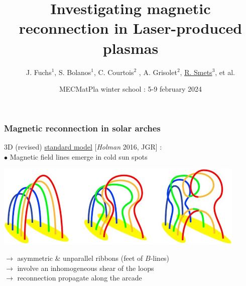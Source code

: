 \documentclass{beamer}
\title{Investigating magnetic reconnection in Laser-produced plasmas}
\author{J. Fuchs$^1$, S. Bolanos$^1$, C. Courtois$^2$ , A. Grisolet$^2$, \underline{R. Smets}$^3$, et al.}
\institute{$^1$LULI, $^2$CEA, $^3$LPP...}
\date{MECMatPla winter school : 5-9 february 2024}
\begin{document}
\frame{\titlepage}



\begin{frame}
\frametitle{Magnetic reconnection in solar arches}

3D (revised) \underline{standard model} [\textit{Holman} 2016, JGR] : \\[0.4cm]
$\bullet$ Magnetic field lines emerge in cold sun spots

\begin{center}
\includegraphics[width=0.9\textwidth]{standard_model.jpg}
\end{center}

$\to$ asymmetric \& unparallel ribbons (feet of $B$-lines) \\
$\to$ involve an inhomogeneous shear of the loops \\
$\to$ reconnection propagate along the arcade \\

\end{frame}
\end{document}
